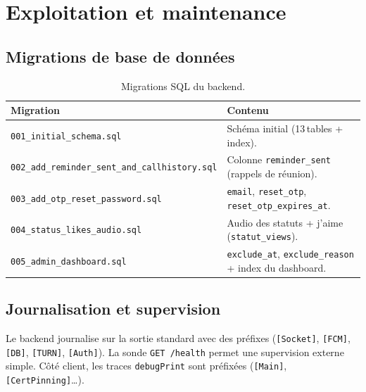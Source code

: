 \documentclass[11pt,a4paper,oneside]{report}
\newcommand{\thd}[1]{\textbf{\textcolor{AlanyaIndigoDark}{#1}}}
\begin{document}
\chapter{Exploitation et maintenance}
\label{chap:exploitation}

\section{Migrations de base de donn\'{e}es}
\begin{table}[H]
\centering\small
\begin{tabularx}{\linewidth}{@{}l X@{}}
\toprule
\thd{Migration} & \thd{Contenu}\\
\midrule
\texttt{001\_initial\_schema.sql} & Sch\'{e}ma initial (13\,tables + index).\\
\texttt{002\_add\_reminder\_sent\_and\_callhistory.sql} & Colonne \texttt{reminder\_sent} (rappels de r\'{e}union).\\
\texttt{003\_add\_otp\_reset\_password.sql} & \texttt{email}, \texttt{reset\_otp}, \texttt{reset\_otp\_expires\_at}.\\
\texttt{004\_status\_likes\_audio.sql} & Audio des statuts + \og{}j'aime\fg{} (\texttt{statut\_views}).\\
\texttt{005\_admin\_dashboard.sql} & \texttt{exclude\_at}, \texttt{exclude\_reason} + index du dashboard.\\
\bottomrule
\end{tabularx}
\caption{Migrations SQL du backend.}
\end{table}

\section{Journalisation et supervision}
Le backend journalise sur la sortie standard avec des pr\'{e}fixes
(\texttt{[Socket]}, \texttt{[FCM]}, \texttt{[DB]}, \texttt{[TURN]}, \texttt{[Auth]}). La
sonde \texttt{GET /health} permet une supervision externe simple. C\^{o}t\'{e} client,
les traces \texttt{debugPrint} sont pr\'{e}fix\'{e}es (\texttt{[Main]}, \texttt{[CertPinning]}\ldots).
\end{document}
